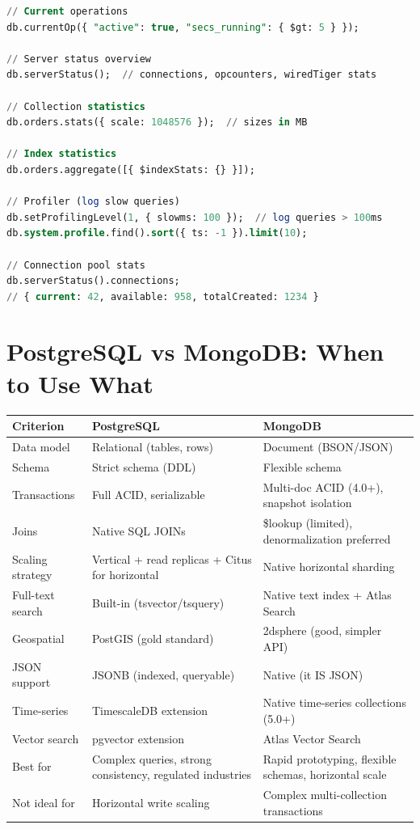 \documentclass[12pt,a4paper]{article}
\begin{document}
\begin{lstlisting}[language=SQL, caption={MongoDB monitoring}]
// Current operations
db.currentOp({ "active": true, "secs_running": { $gt: 5 } });

// Server status overview
db.serverStatus();  // connections, opcounters, wiredTiger stats

// Collection statistics
db.orders.stats({ scale: 1048576 });  // sizes in MB

// Index statistics
db.orders.aggregate([{ $indexStats: {} }]);

// Profiler (log slow queries)
db.setProfilingLevel(1, { slowms: 100 });  // log queries > 100ms
db.system.profile.find().sort({ ts: -1 }).limit(10);

// Connection pool stats
db.serverStatus().connections;
// { current: 42, available: 958, totalCreated: 1234 }
\end{lstlisting}


\section{PostgreSQL vs MongoDB: When to Use What}

\begin{center}
\begin{longtable}{p{3.5cm}p{5cm}p{5cm}}
\toprule
\textbf{Criterion} & \textbf{PostgreSQL} & \textbf{MongoDB} \\
\midrule
\endhead
Data model & Relational (tables, rows) & Document (BSON/JSON) \\
Schema & Strict schema (DDL) & Flexible schema \\
Transactions & Full ACID, serializable & Multi-doc ACID (4.0+), snapshot isolation \\
Joins & Native SQL JOINs & \$lookup (limited), denormalization preferred \\
Scaling strategy & Vertical + read replicas + Citus for horizontal & Native horizontal sharding \\
Full-text search & Built-in (tsvector/tsquery) & Native text index + Atlas Search \\
Geospatial & PostGIS (gold standard) & 2dsphere (good, simpler API) \\
JSON support & JSONB (indexed, queryable) & Native (it IS JSON) \\
Time-series & TimescaleDB extension & Native time-series collections (5.0+) \\
Vector search & pgvector extension & Atlas Vector Search \\
Best for & Complex queries, strong consistency, regulated industries & Rapid prototyping, flexible schemas, horizontal scale \\
Not ideal for & Horizontal write scaling & Complex multi-collection transactions \\
\bottomrule
\end{longtable}
\end{center}
\end{document}
